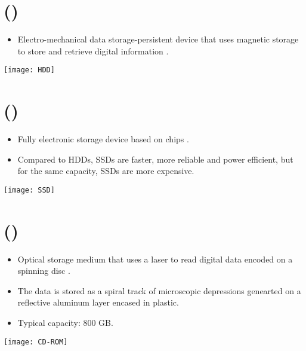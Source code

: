\section{ ()}
\begin{itemize}
\item Electro-mechanical data storage-persistent device that uses
  magnetic storage to store and retrieve digital information
  \cite{wikipedia_NDD}.
\end{itemize}
\vspace{-2ex}
\begin{center}
  \texttt{[image: HDD]}
\end{center}

\section{ ()}
\begin{itemize}
\item Fully electronic storage device based on  chips \cite{wikipedia_SSD}.
\item Compared to \gls{HDD}s, \gls{SSD}s are faster, more reliable and
  power efficient, but for the same capacity, \gls{SSD}s are more
  expensive.
\end{itemize}
\vspace{-2ex}
\begin{center}
  \texttt{[image: SSD]}
\end{center}

\section{ ({)}}
\begin{itemize}
\item Optical storage medium that uses a laser to read digital data
  encoded on a spinning disc \cite{wikipedia_CD-ROM}.
\item The data is stored as a spiral track of microscopic depressions
  genearted on a reflective aluminum layer encased in plastic.
\item Typical capacity: 800 GB.
\end{itemize}
\vspace{-4ex}
\begin{center}
  \texttt{[image: CD-ROM]}
\end{center}
  
